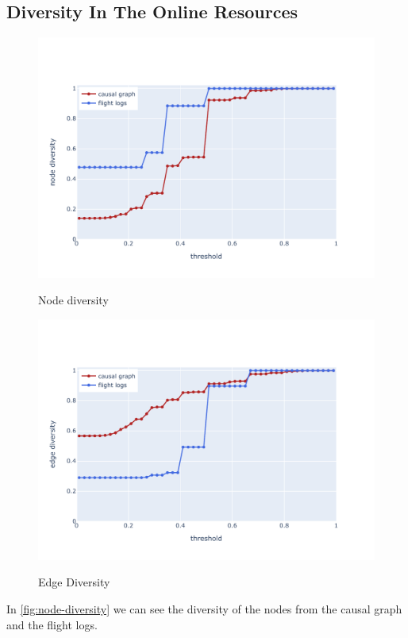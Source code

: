 \subsection{Diversity In The Online Resources}\label{subsec:how-diverse-are-the-mentioned-cause-and-effect-events-in-the-online-resources?}
\begin{figure}
    \begin{center}
        \includegraphics[scale=.65]{figures/results/node_diversity}
        \caption{Node diversity}\label{fig:node-diversity}
        \includegraphics[scale=.65]{figures/results/edge_diversity}
        \caption{Edge Diversity}\label{fig:edge-diversity}
    \end{center}
\end{figure}
In \autoref{fig:node-diversity} we can see the diversity of the nodes from the causal graph and the flight logs.
